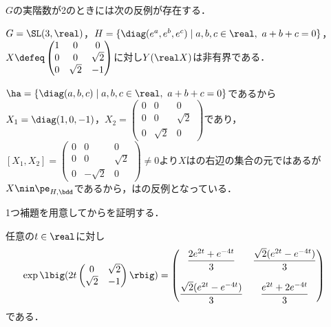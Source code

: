 $G$の実階数が2のときには次の反例が存在する．

\begin{prop}\label{prop:0114}
  $G = \SL(3,\real) $，$H = \{\diag(e^a,e^b,e^c)\mid a,b,c\in \real,\ a+ b + c = 0 \} $，$X\defeq
  \begin{pmatrix}
    1 & 0 & 0 \\
    0 & 0 & \sqrt{2} \\
    0 & \sqrt{2} & -1
  \end{pmatrix}
  $に対し$Y(\real X) $は非有界である．
\end{prop}


$\ha = \{\diag(a,b,c)\mid a,b,c\in \real,\ a +b + c = 0 \}  $であるから$X_1 = \diag(1,0,-1)$，$X_2 = \begin{pmatrix}
  0 & 0 & 0 \\
  0 & 0 & \sqrt{2} \\
  0 & \sqrt{2} & 0
\end{pmatrix}$であり，$[X_1, X_2] = \begin{pmatrix}
  0 & 0 & 0 \\
  0 & 0 & \sqrt{2} \\
  0 & -\sqrt{2} & 0
\end{pmatrix} \neq 0$より$X$はの右辺の集合の元ではあるが$X\nin \pe_{H,\bdd} $であるから，はの反例となっている．

1つ補題を用意してからを証明する．
\begin{lem}\label{lem:0114}
  任意の$t\in \real$に対し
  \begin{align*}
    \exp\lbig(2t\begin{pmatrix}
      0 & \sqrt{2} \\
      \sqrt{2} & -1 
    \end{pmatrix}\rbig) &=
                 \begin{pmatrix}
                   \dfrac{2e^{2t} + e^{-4t}}{3} &  \dfrac{\sqrt{2} (e^{2t} - e^{-4t})}{3}\\
                   \\
                   \dfrac{\sqrt{2} (e^{2t} - e^{-4t})}{3} & \dfrac{e^{2t} + 2e^{-4t}}{3}
                 \end{pmatrix}
  \end{align*}
  である．
\end{lem}

